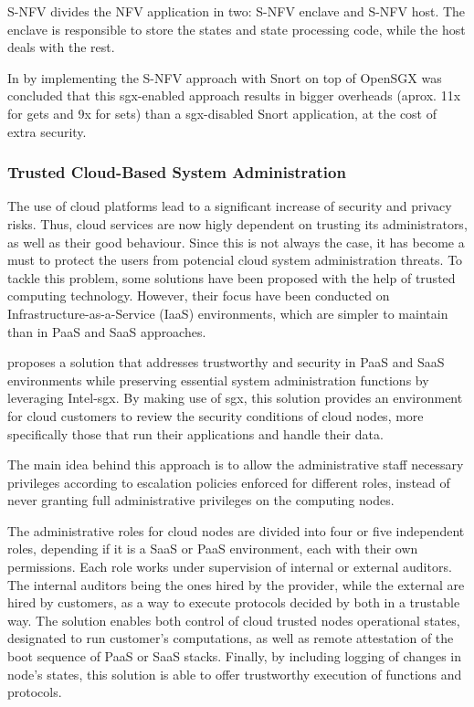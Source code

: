 S-NFV divides the NFV application in two: S-NFV enclave and S-NFV host. The enclave is responsible to store the states and state processing code, while the host deals with the rest.

In \cite{sNFVPaper} by implementing the S-NFV approach with Snort \cite{snortPaper} on top of OpenSGX was
concluded that this \gls{sgx}-enabled approach results in bigger overheads (aprox. 11x for
gets and 9x for sets) than a \gls{sgx}-disabled Snort application, at the cost of extra security.


\subsubsection{Trusted Cloud-Based System Administration}
\label{sssec:sgxSysAdmin}

The use of cloud platforms lead to a significant increase of security and privacy risks. Thus, cloud services are now higly dependent on trusting its administrators, as well as their good behaviour. Since this is not always the case, it has become a must to protect the users from potencial cloud system administration threats. 
To tackle this problem, some solutions have been proposed with the help of trusted computing technology. However, their focus have been conducted on Infrastructure-as-a-Service (IaaS) environments, which are simpler to maintain than in PaaS and SaaS approaches.

\cite{sgxCloudThesis} proposes a solution that addresses trustworthy and security in PaaS and SaaS environments while preserving essential system administration functions by leveraging Intel-\gls{sgx}. By making use of \gls{sgx}, this solution provides an environment for cloud customers to review the security conditions of cloud nodes, more specifically those that run their applications and handle their data.

The main idea behind this approach is to allow the administrative staff necessary privileges according to escalation policies enforced for different roles, instead of never granting full administrative privileges on the computing nodes.

The administrative roles for cloud nodes are divided into four or five independent roles, depending if it is a SaaS or PaaS environment, each with their own permissions. Each role works under supervision of internal or external auditors. The internal auditors being the ones hired by the provider, while the external are hired by customers, as a way to execute protocols decided by both in a trustable way. The solution enables both control of cloud trusted nodes operational states, designated to run customer's computations, as well as remote attestation of the boot sequence of PaaS or SaaS stacks. Finally, by including logging of changes in node's states, this solution is able to offer trustworthy execution of functions and protocols.

